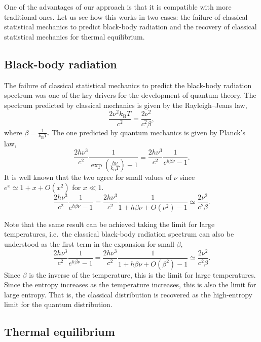 \documentclass{article}
\begin{document}
One of the advantages of our approach is that it is compatible with more traditional ones. Let us see how this works in two cases: the failure of classical statistical mechanics to predict black-body radiation and the recovery of classical statistical mechanics for thermal equilibrium.

\subsection{Black-body radiation}

The failure of classical statistical mechanics to predict the black-body radiation spectrum was one of the key drivers for the development of quantum theory. The spectrum predicted by classical mechanics is given by the Rayleigh–Jeans law,
\begin{equation}
    \frac{2 \nu^2 k_\text{B} T}{c^2} = \frac{2 \nu^2}{c^2 \beta},
\end{equation}
where $\beta = \frac{1}{k_\text{B} T}$. The one predicted by quantum mechanics is given by Planck's law,
\begin{equation}
    \frac{ 2 h \nu^3}{c^2} \frac 1{\exp\left(\frac{h\nu}{k_\mathrm B T}\right) - 1} = \frac{ 2 h \nu^3}{c^2} \frac 1{e^{h \beta \nu} - 1}.
\end{equation}
It is well known that the two agree for small values of $\nu$ since $e^x \simeq 1 + x + O(x^2)$ for $x\ll 1$.
\begin{equation}
    \frac{ 2 h \nu^3}{c^2} \frac 1{e^{h \beta \nu} - 1} = \frac{ 2 h \nu^3}{c^2} \frac 1{1 + h \beta \nu + O\left(\nu^2\right) - 1} \simeq \frac{2 \nu^2}{c^2 \beta}.
\end{equation}

Note that the same result can be achieved taking the limit for large temperatures, i.e.~the classical black-body radiation spectrum can also be understood as the first term in the expansion for small $\beta$,
\begin{equation}
    \frac{ 2 h \nu^3}{c^2} \frac 1{e^{h \beta \nu} - 1} = \frac{ 2 h \nu^3}{c^2} \frac 1{1 + h \beta \nu + O\left(\beta^2\right) - 1} \simeq \frac{2 \nu^2}{c^2 \beta}.
\end{equation}
Since $\beta$ is the inverse of the temperature, this is the limit for large temperatures. Since the entropy increases as the temperature increases, this is also the limit for large entropy. That is, the classical distribution is recovered as the high-entropy limit for the quantum distribution.

\subsection{Thermal equilibrium}
\end{document}

